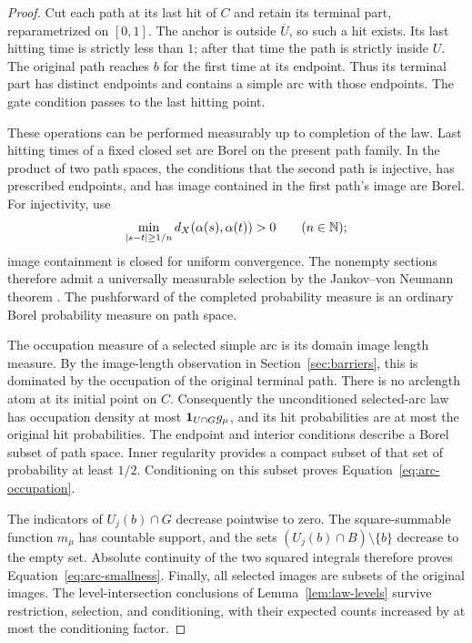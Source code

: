 \begin{proof}
Cut each path at its last hit of $C$ and retain its terminal part,
reparametrized on $[0,1]$.
The anchor is outside $\overline U$, so such a hit exists.  Its last
hitting time is strictly less than $1$; after that time the path is
strictly inside $U$.  The original path reaches $b$ for the first time
at its endpoint.  Thus its terminal part has distinct endpoints and
contains a simple arc with those endpoints.  The gate condition passes
to the last hitting point.

These operations can be performed measurably up to completion of the
law.  Last hitting times of a fixed closed set are Borel on the present
path family.  In the product of two path spaces, the conditions that
the second path is injective, has prescribed endpoints, and has image
contained in the first path's image are Borel.  For injectivity, use
\[
 \min_{|s-t|\ge 1/n}d_X(\alpha(s),\alpha(t))>0
 \qquad(n\in\mathbb N);
\]
image containment is closed for uniform convergence.  The nonempty
sections therefore admit a universally measurable selection by the
Jankov--von Neumann theorem \cite[Theorems~18.1 and 29.9]{Kechris1995}.  The
pushforward of the completed probability measure is an ordinary Borel
probability measure on path space.

The occupation measure of a selected simple arc is its domain image
length measure.  By the image-length observation in
Section~\ref{sec:barriers}, this is dominated by the occupation of the
original terminal path.  There is no arclength atom at its initial
point on $C$.  Consequently the unconditioned selected-arc law has
occupation density at most $\mathbf 1_{U\cap G}g_\mu$, and its hit probabilities are
at most the original hit probabilities.  The endpoint and interior
conditions describe a Borel subset of path space.  Inner regularity
provides a compact subset of that set of probability at least $1/2$.
Conditioning on this subset proves Equation~\eqref{eq:arc-occupation}.

The indicators of $U_j(b)\cap G$ decrease pointwise to zero.  The
square-summable function $m_\mu$ has countable support, and the sets
$(U_j(b)\cap B)\setminus\{b\}$ decrease to the empty set.  Absolute
continuity of the two squared integrals therefore proves
Equation~\eqref{eq:arc-smallness}.  Finally, all selected images are
subsets of the original images.  The level-intersection conclusions of
Lemma~\ref{lem:law-levels} survive restriction, selection, and
conditioning, with their expected counts increased by at most the
conditioning factor.
\end{proof}

